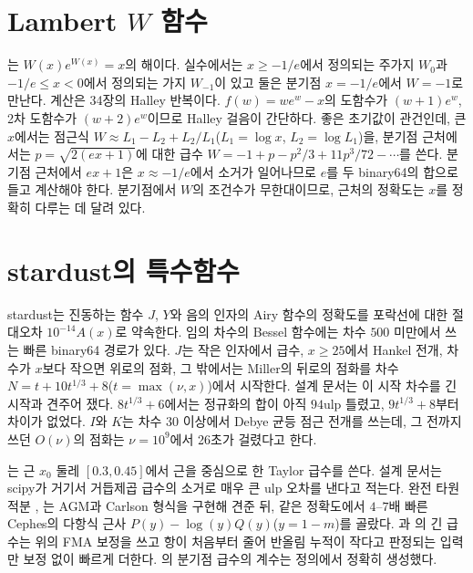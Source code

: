 \section{Lambert $W$ 함수}
\label{sec:lambertw}

는 $W(x)e^{W(x)}=x$의 해이다. 실수에서는 $x\ge-1/e$에서 정의되는 주가지 $W_0$과 $-1/e\le x<0$에서 정의되는 가지 $W_{-1}$이 있고 둘은 분기점 $x=-1/e$에서 $W=-1$로 만난다\cite{corless1996lambert}. 계산은 34장의 Halley 반복이다. $f(w)=we^w-x$의 도함수가 $(w+1)e^w$, 2차 도함수가 $(w+2)e^w$이므로 Halley 걸음이 간단하다. 좋은 초기값이 관건인데, 큰 $x$에서는 점근식 $W\approx L_1-L_2+L_2/L_1$($L_1=\log x$, $L_2=\log L_1$)을, 분기점 근처에서는 $p=\sqrt{2(ex+1)}$에 대한 급수 $W=-1+p-p^2/3+11p^3/72-\cdots$를 쓴다. 분기점 근처에서 $ex+1$은 $x\approx-1/e$에서 소거가 일어나므로 $e$를 두 binary64의 합으로 들고 계산해야 한다. 분기점에서 $W$의 조건수가 무한대이므로, 근처의 정확도는 $x$를 정확히 다루는 데 달려 있다.

\section{stardust의 특수함수}
\label{sec:special3-stardust}

\begin{instardust}
stardust는 진동하는 함수 $J$, $Y$와 음의 인자의 Airy 함수의 정확도를 포락선에 대한 절대오차 $10^{-14}A(x)$로 약속한다. 임의 차수의 Bessel 함수에는 차수 $500$ 미만에서 쓰는 빠른 binary64 경로가 있다. $J$는 작은 인자에서 급수, $x\ge25$에서 Hankel 전개, 차수가 $x$보다 작으면 위로의 점화, 그 밖에서는 Miller의 뒤로의 점화를 차수 $N=t+10t^{1/3}+8$($t=\max(\nu,x)$)에서 시작한다. 설계 문서는 이 시작 차수를 긴 시작과 견주어 쟀다. $8t^{1/3}+6$에서는 정규화의 합이 아직 $94$ulp 틀렸고, $9t^{1/3}+8$부터 차이가 없었다. $I$와 $K$는 차수 $30$ 이상에서 Debye 균등 점근 전개를 쓰는데, 그 전까지 쓰던 $O(\nu)$의 점화는 $\nu=10^9$에서 26초가 걸렸다고 한다.
\end{instardust}

\begin{instardust}
는 근 $x_0$ 둘레 $[0.3,0.45]$에서 근을 중심으로 한 Taylor 급수를 쓴다. 설계 문서는 scipy가 거기서 거듭제곱 급수의 소거로 매우 큰 ulp 오차를 낸다고 적는다. 완전 타원적분 , 는 AGM과 Carlson 형식을 구현해 견준 뒤, 같은 정확도에서 $4$--$7$배 빠른 Cephes의 다항식 근사 $P(y)-\log(y)Q(y)$($y=1-m$)를 골랐다. 과 의 긴 급수는 위의 FMA 보정을 쓰고 항이 처음부터 줄어 반올림 누적이 작다고 판정되는 입력만 보정 없이 빠르게 더한다. 의 분기점 급수의 계수는 정의에서 정확히 생성했다.
\end{instardust}

